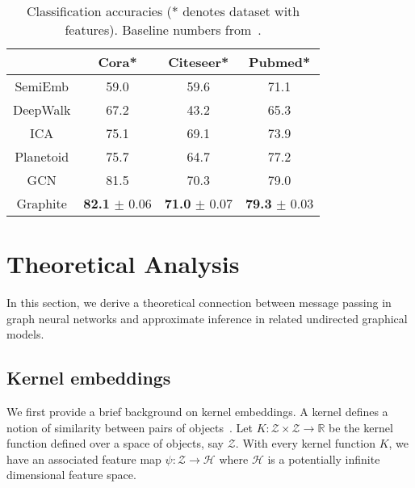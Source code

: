 \documentclass{article}
\begin{document}
\begin{table}[t]
\centering
  \caption{Classification accuracies (* denotes dataset with features). Baseline numbers from~\citet{kipf2016semi}.}
  \label{table-acc}
  \centering
\vspace{0.05in}
  \begin{tabular}{|c|c|c|c|}
    \toprule
	& Cora* & Citeseer* & Pubmed* \\
    \midrule
    SemiEmb & 59.0 & 59.6 & 71.1 \\
    DeepWalk & 67.2 & 43.2 & 65.3 \\
    ICA & 75.1 & 69.1 & 73.9 \\
    Planetoid & 75.7 & 64.7 & 77.2 \\
    GCN & 81.5 & 70.3 & 79.0\\ \midrule
    Graphite & \textbf{82.1} $\pm$ 0.06 & \textbf{71.0} $\pm$ 0.07 & \textbf{79.3} $\pm$ 0.03\\
    \bottomrule
  \end{tabular}
\end{table}
 
\section{ Theoretical Analysis}\label{sec:interpret}

In this section, we derive a theoretical connection between message passing in graph neural networks and approximate inference in related undirected graphical models. 

\subsection{Kernel embeddings}
We first provide a brief background on kernel embeddings.
A kernel defines a notion of similarity between pairs of objects~\citep{scholkopf2002learning,shawe2004kernel}.
Let $K: \mathcal{Z} \times \mathcal{Z} \rightarrow \mathbb{R}$ be the kernel function defined over a space of objects, say $\mathcal{Z}$. 
With every kernel function $K$, we have an associated feature map $\psi:\mathcal{Z} \to \mathcal{H}$ where $\mathcal{H}$ is a potentially infinite dimensional feature space.
\end{document}
